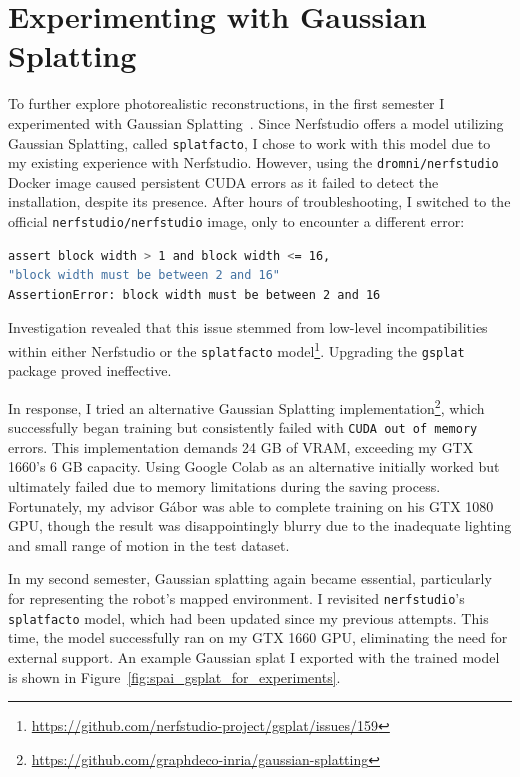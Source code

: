 \section{Experimenting with Gaussian Splatting}

To further explore photorealistic reconstructions, in the first semester I experimented with Gaussian Splatting~\cite{3DGS}. Since Nerfstudio offers a model utilizing Gaussian Splatting, called \texttt{splatfacto}, I chose to work with this model due to my existing experience with Nerfstudio. However, using the \texttt{dromni/nerfstudio} Docker image caused persistent CUDA errors as it failed to detect the installation, despite its presence. After hours of troubleshooting, I switched to the official \texttt{nerfstudio/nerfstudio} image, only to encounter a different error:

\FloatBarrier
\begin{lstlisting}[language=bash,frame=single,float=!ht]
assert block width > 1 and block width <= 16, 
"block width must be between 2 and 16"
AssertionError: block width must be between 2 and 16
\end{lstlisting}

Investigation revealed that this issue stemmed from low-level incompatibilities within either Nerfstudio or the \texttt{splatfacto} model\footnote{\url{https://github.com/nerfstudio-project/gsplat/issues/159}}. Upgrading the \texttt{gsplat} package proved ineffective.

In response, I tried an alternative Gaussian Splatting implementation\footnote{\url{https://github.com/graphdeco-inria/gaussian-splatting}}, which successfully began training but consistently failed with \texttt{CUDA out of memory} errors. This implementation demands 24 GB of VRAM, exceeding my GTX 1660’s 6 GB capacity. Using Google Colab as an alternative initially worked but ultimately failed due to memory limitations during the saving process. Fortunately, my advisor Gábor was able to complete training on his GTX 1080 GPU, though the result was disappointingly blurry due to the inadequate lighting and small range of motion in the test dataset.

In my second semester, Gaussian splatting again became essential, particularly for representing the robot’s mapped environment. I revisited \texttt{nerfstudio}'s \texttt{splatfacto} model, which had been updated since my previous attempts. This time, the model successfully ran on my GTX 1660 GPU, eliminating the need for external support. An example Gaussian splat I exported with the trained model is shown in Figure~\ref{fig:spai_gsplat_for_experiments}.

